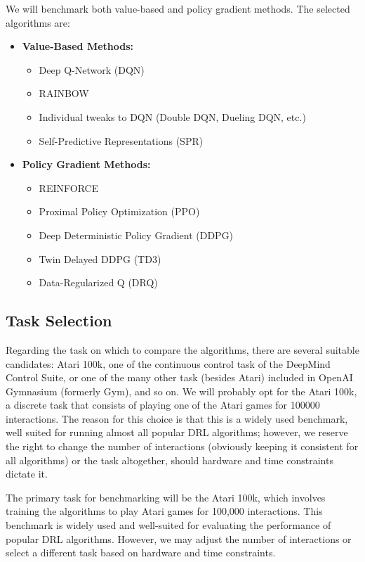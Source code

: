 We will benchmark both value-based and policy gradient methods. The selected algorithms are:

\begin{itemize}
	\item \textbf{Value-Based Methods:}
	\begin{itemize}
		\item Deep Q-Network (DQN)
		\item RAINBOW
		\item Individual tweaks to DQN (Double DQN, Dueling DQN, etc.)
		\item Self-Predictive Representations (SPR)
	\end{itemize}
	\item \textbf{Policy Gradient Methods:}
	\begin{itemize}
		\item REINFORCE
		\item Proximal Policy Optimization (PPO)
		\item Deep Deterministic Policy Gradient (DDPG)
		\item Twin Delayed DDPG (TD3)
		\item Data-Regularized Q (DRQ)
	\end{itemize}
\end{itemize}

\subsection{Task Selection}
\label{subsec:task_selection}

%

Regarding the task on which to compare the algorithms, there are several suitable candidates: Atari 100k, one of the continuous control task of the DeepMind Control Suite, or one of the many other task (besides Atari) included in OpenAI Gymnasium (formerly Gym), and so on. We will probably opt for the Atari 100k, a discrete task that consists of playing one of the Atari games for 100000 interactions. 
The reason for this choice is that this is a widely used benchmark, well suited for running almost all popular DRL algorithms; however, we reserve the right to change the number of interactions (obviously keeping it consistent for all algorithms) or the task altogether, should hardware and time constraints dictate it.

%
The primary task for benchmarking will be the Atari 100k, which involves training the algorithms to play Atari games for 100,000 interactions. This benchmark is widely used and well-suited for evaluating the performance of popular DRL algorithms. However, we may adjust the number of interactions or select a different task based on hardware and time constraints.


